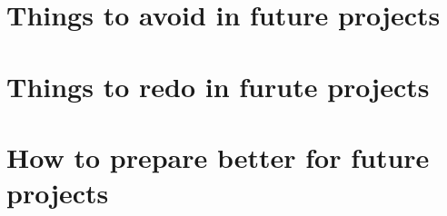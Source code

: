 \section{Things to avoid in future projects}

\section{Things to redo in furute projects}

\section{How to prepare better for future projects}
